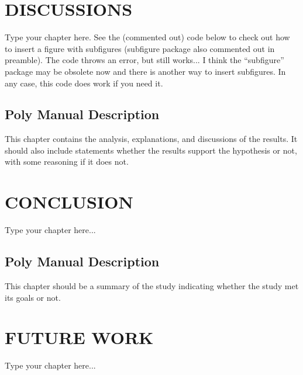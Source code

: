 \documentclass{article}
\begin{document}
\begin{body}
\chapter{DISCUSSIONS}
Type your chapter here. See the (commented out) code below to check out how to insert a figure with subfigures (subfigure package also commented out in preamble). The code throws an error, but still works... I think the ``subfigure'' package may be obsolete now and there is another way to insert subfigures. In any case, this code does work if you need it.






\section{Poly Manual Description}
This chapter contains the analysis, explanations, and discussions of the results. It should also include statements whether the results support the hypothesis or not, with some reasoning if it does not.







\chapter{CONCLUSION}
Type your chapter here...



\section{Poly Manual Description}
This chapter should be a summary of the study indicating whether the study met its goals or not.



\chapter{FUTURE WORK}
Type your chapter here...



\end{body}
\end{document}

